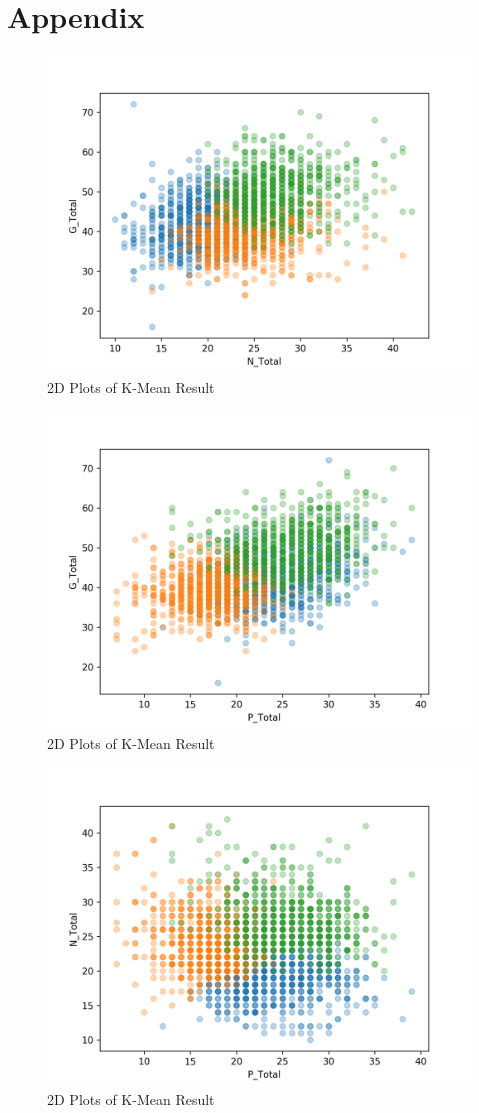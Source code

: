 \documentclass[11pt]{article}
\begin{document}
	\section{Appendix}
	\begin{figure}[H]
		\centering
		\includegraphics[width=0.7\linewidth]{figures/3_means_N_Total_G_Total.png}
		\caption{2D Plots of K-Mean Result}
	\end{figure}
	\begin{figure}[H]
	\centering
		\includegraphics[width=0.7\linewidth]{figures/3_means_P_Total_G_Total.png}
		\caption{2D Plots of K-Mean Result}
	\end{figure}
	\begin{figure}[H]
		\centering
		\includegraphics[width=0.7\linewidth]{figures/3_means_P_Total_N_Total.png}
		\caption{2D Plots of K-Mean Result}
	\end{figure}
\end{document}
